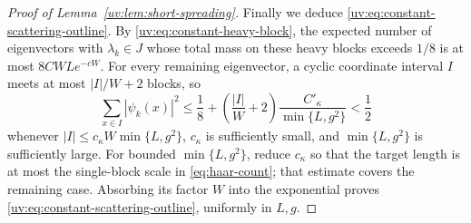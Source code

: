 \documentclass[11pt]{article}
\numberwithin{equation}{section}
\theoremstyle{remark}
\begin{document}
\begin{proof}[Proof of Lemma~\ref{uv:lem:short-spreading}]
Finally we deduce \eqref{uv:eq:constant-scattering-outline}.
By \eqref{uv:eq:constant-heavy-block}, the expected number of
eigenvectors with $\lambda_k\in J$ whose total mass on these heavy blocks
exceeds $1/8$ is at most $8CWL e^{-cW}$. For every remaining eigenvector,
a cyclic coordinate interval $I$ meets at most $|I|/W+2$ blocks, so
\[
 \sum_{x\in I}|\psi_k(x)|^2
 \le\frac18+\left(\frac{|I|}{W}+2\right)
                   \frac{C'_\kappa}{\min\{L,g^2\}}<\frac12
\]
whenever $|I|\le c_\kappa W\min\{L,g^2\}$, $c_\kappa$ is sufficiently
small, and $\min\{L,g^2\}$ is sufficiently large.
For bounded $\min\{L,g^2\}$, reduce $c_\kappa$ so that the target
length is at most the single-block scale in \eqref{eq:haar-count};
that estimate covers the remaining case. Absorbing its factor $W$
into the exponential proves \eqref{uv:eq:constant-scattering-outline},
uniformly in $L,g$.
\end{proof}
\end{document}
